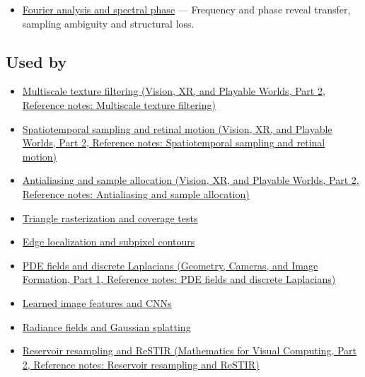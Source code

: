 \hypertarget{appendix-6a7869dd79a6-prerequisites}{}

\begin{itemize}
\tightlist
\item
  \hyperref[appendix-b60686ba06a1]{Fourier analysis and spectral phase} --- Frequency and phase reveal transfer, sampling ambiguity and structural loss.
\end{itemize}

\subsection{Used by}\label{appendix-6a7869dd79a6-used-by}

\hypertarget{appendix-6a7869dd79a6-used-by}{}

\begin{itemize}
\item
  \href{../07-Vision-XR-and-Playable-Worlds-P02/main.pdf\#nameddest=appendix-b677a85ba76f}{Multiscale texture filtering (Vision, XR, and Playable Worlds, Part 2, Reference notes: Multiscale texture filtering)}
\item
  \href{../07-Vision-XR-and-Playable-Worlds-P02/main.pdf\#nameddest=appendix-70895739febb}{Spatiotemporal sampling and retinal motion (Vision, XR, and Playable Worlds, Part 2, Reference notes: Spatiotemporal sampling and retinal motion)}
\item
  \href{../07-Vision-XR-and-Playable-Worlds-P02/main.pdf\#nameddest=appendix-4192b2bdd21e}{Antialiasing and sample allocation (Vision, XR, and Playable Worlds, Part 2, Reference notes: Antialiasing and sample allocation)}
\item
  \hyperref[appendix-ed3f9bc298fe]{Triangle rasterization and coverage tests}
\item
  \hyperref[appendix-36022286b03e]{Edge localization and subpixel contours}
\item
  \href{../03-Geometry-Cameras-and-Image-Formation-P01/main.pdf\#nameddest=appendix-1988d465c119}{PDE fields and discrete Laplacians (Geometry, Cameras, and Image Formation, Part 1, Reference notes: PDE fields and discrete Laplacians)}
\item
  \hyperref[appendix-47c51ea026fb]{Learned image features and CNNs}
\item
  \hyperref[appendix-c5b332e400e7]{Radiance fields and Gaussian splatting}
\item
  \href{../02-Mathematics-for-Visual-Computing-P02/main.pdf\#nameddest=appendix-68be451b78b1}{Reservoir resampling and ReSTIR (Mathematics for Visual Computing, Part 2, Reference notes: Reservoir resampling and ReSTIR)}

\end{itemize}
